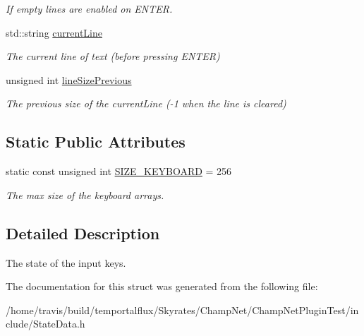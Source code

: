 \begin{DoxyCompactItemize}
\begin{DoxyCompactList}\small\item\em If empty lines are enabled on E\-N\-T\-E\-R. \end{DoxyCompactList}\item 
\hypertarget{struct_state_input_a5ce1360c9195f7dfe700e9398b9c8e7b}{std\-::string \hyperlink{struct_state_input_a5ce1360c9195f7dfe700e9398b9c8e7b}{current\-Line}}\label{struct_state_input_a5ce1360c9195f7dfe700e9398b9c8e7b}

\begin{DoxyCompactList}\small\item\em The current line of text (before pressing E\-N\-T\-E\-R) \end{DoxyCompactList}\item 
\hypertarget{struct_state_input_ab6d707a36eabe343d0b46838773da8f9}{unsigned int \hyperlink{struct_state_input_ab6d707a36eabe343d0b46838773da8f9}{line\-Size\-Previous}}\label{struct_state_input_ab6d707a36eabe343d0b46838773da8f9}

\begin{DoxyCompactList}\small\item\em The previous size of the current\-Line (-\/1 when the line is cleared) \end{DoxyCompactList}\end{DoxyCompactItemize}
\subsection*{Static Public Attributes}
\begin{DoxyCompactItemize}
\item 
\hypertarget{struct_state_input_acc91adb5a30e828f5fd4be0228a09040}{static const unsigned int \hyperlink{struct_state_input_acc91adb5a30e828f5fd4be0228a09040}{S\-I\-Z\-E\-\_\-\-K\-E\-Y\-B\-O\-A\-R\-D} = 256}\label{struct_state_input_acc91adb5a30e828f5fd4be0228a09040}

\begin{DoxyCompactList}\small\item\em The max size of the keyboard arrays. \end{DoxyCompactList}\end{DoxyCompactItemize}


\subsection{Detailed Description}
The state of the input keys. 

The documentation for this struct was generated from the following file\-:\begin{DoxyCompactItemize}
\item 
/home/travis/build/temportalflux/\-Skyrates/\-Champ\-Net/\-Champ\-Net\-Plugin\-Test/include/State\-Data.\-h\end{DoxyCompactItemize}
